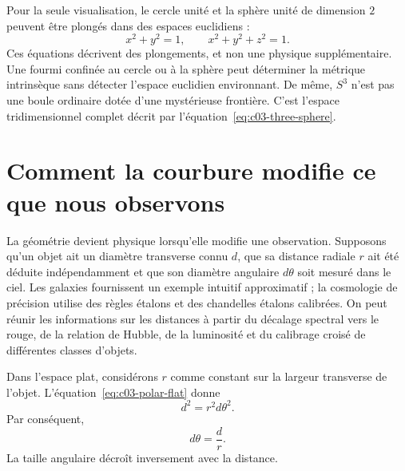 \begin{classroomqa}
\end{classroomqa}

Pour la seule visualisation, le cercle unité et la sphère unité de dimension \(2\) peuvent être plongés dans des espaces euclidiens :
\begin{equation}
x^2+y^2=1,
\qquad
x^2+y^2+z^2=1.
\end{equation}
Ces équations décrivent des plongements, et non une physique supplémentaire. Une fourmi confinée au cercle ou à la sphère peut déterminer la métrique intrinsèque sans détecter l’espace euclidien environnant. De même, \(S^3\) n’est pas une boule ordinaire dotée d’une mystérieuse frontière. C’est l’espace tridimensionnel complet décrit par l’équation~\eqref{eq:c03-three-sphere}.

\section{Comment la courbure modifie ce que nous observons}

La géométrie devient physique lorsqu’elle modifie une observation. Supposons qu’un objet ait un diamètre transverse connu \(d\), que sa distance radiale \(r\) ait été déduite indépendamment et que son diamètre angulaire \(d\theta\) soit mesuré dans le ciel. Les galaxies fournissent un exemple intuitif approximatif ; la cosmologie de précision utilise des règles étalons et des chandelles étalons calibrées. On peut réunir les informations sur les distances à partir du décalage spectral vers le rouge, de la relation de Hubble, de la luminosité et du calibrage croisé de différentes classes d’objets.

Dans l’espace plat, considérons \(r\) comme constant sur la largeur transverse de l’objet. L’équation~\eqref{eq:c03-polar-flat} donne
\begin{equation}
d^2 = r^2 d\theta^2.
\label{eq:c03-flat-angle-step}
\end{equation}
Par conséquent,
\begin{equation}
d\theta = \frac{d}{r}.
\label{eq:c03-flat-angle}
\end{equation}
La taille angulaire décroît inversement avec la distance.

